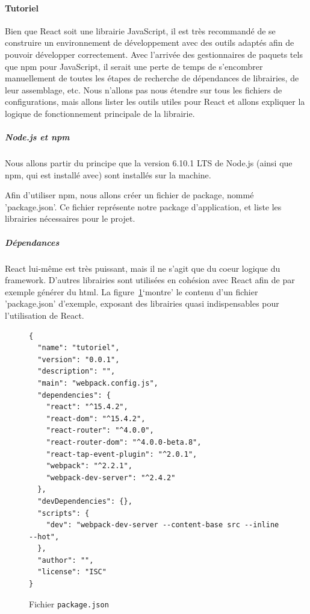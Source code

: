 			\paragraph{Tutoriel}

			Bien que React soit une librairie JavaScript, il est très recommandé de se construire un environnement de développement avec des outils adaptés afin de pouvoir développer correctement. Avec l'arrivée des gestionnaires de paquets tels que npm pour JavaScript, il serait une perte de temps de s'encombrer manuellement de toutes les étapes de recherche de dépendances de librairies, de leur assemblage, etc. Nous n'allons pas nous étendre sur tous les fichiers de configurations, mais allons lister les outils utiles pour React et allons expliquer la logique de fonctionnement principale de la librairie.

			\subparagraph{Node.js et npm}

			Nous allons partir du principe que la version 6.10.1 LTS de Node.js\cite{nodejs} (ainsi que npm\cite{npm}, qui est installé avec) sont installés sur la machine.

			Afin d'utiliser npm, nous allons créer un fichier de package, nommé 'package.json'. Ce fichier représente notre package d'application, et liste les librairies nécessaires pour le projet.

			\subparagraph{Dépendances}

			React lui-même est très puissant, mais il ne s'agit que du coeur logique du framework. D'autres librairies sont utilisées en cohésion avec React afin de par exemple générer du html. La figure~\ref{analyse_tutoriel_package}`montre' le contenu d'un fichier 'package.json' d'exemple, exposant des librairies quasi indispensables pour l'utilisation de React.

			\begin{figure}[!h]
				\begin{lstlisting}[]
{
  "name": "tutoriel",
  "version": "0.0.1",
  "description": "",
  "main": "webpack.config.js",
  "dependencies": {
    "react": "^15.4.2",
    "react-dom": "^15.4.2",
    "react-router": "^4.0.0",
    "react-router-dom": "^4.0.0-beta.8",
    "react-tap-event-plugin": "^2.0.1",
    "webpack": "^2.2.1",
    "webpack-dev-server": "^2.4.2"
  },
  "devDependencies": {},
  "scripts": {
    "dev": "webpack-dev-server --content-base src --inline --hot",
  },
  "author": "",
  "license": "ISC"
} \end{lstlisting}
				\caption{Fichier \texttt{package.json}}
				\label{analyse_tutoriel_package}
			\end{figure}

